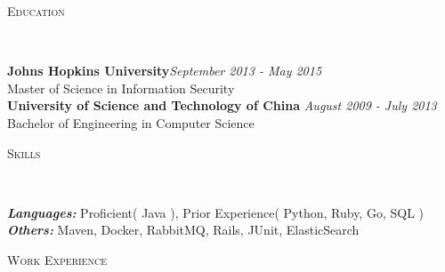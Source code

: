 \documentclass[3pt]{article}
\newenvironment{changemargin}[2]{%
  \begin{list}{}{%
    \setlength{\topsep}{0pt}%
    \setlength{\leftmargin}{#1}%
    \setlength{\rightmargin}{#2}%
    \setlength{\listparindent}{\parindent}%
    \setlength{\itemindent}{\parindent}%
    \setlength{\parsep}{\parskip}%
  }%
  \item[]}{\end{list}
}
\newcommand{\lineover}{
	\begin{changemargin}{-0.05in}{-0.05in}
		\vspace*{-8pt}
		\hrulefill \\
		\vspace*{-2pt}
	\end{changemargin}
}
\newcommand{\header}[1]{
	\begin{changemargin}{-0.5in}{-0.5in}
		{\Large \scshape{#1}}\\
  	\lineover
	\end{changemargin}
}
\newcommand{\contact}[4]{
	\begin{changemargin}{-0.5in}{-0.5in}
		\begin{center}
			{\Large \scshape {#1}}\\ \smallskip
			{#2}\\ \smallskip
			{#3}\\ \smallskip
			{#4}\smallskip
		\end{center}
	\end{changemargin}
}
\newenvironment{body} {
	\vspace*{-16pt}
	\begin{changemargin}{-0.25in}{-0.5in}
  }	
	{\end{changemargin}
}
\begin{document}






\header{Education}

\begin{body}
	\vspace{17pt}
	\textbf{Johns Hopkins University}{}\hfill \emph{September 2013 - May 2015}{} \\
	Master of Science in Information Security \hfill \\
  \smallskip
	\textbf{University of Science and Technology of China} \hfill \emph{August 2009 - July 2013} \\
	Bachelor of Engineering in Computer Science \\
\end{body}

\smallskip

\header{Skills}

\begin{body}
	\vspace{17pt}
	\emph{\textbf{Languages:}}{} Proficient( Java ), Prior Experience( Python, Ruby, Go, SQL )\\
    \emph{\textbf{Others:}}{}  Maven, Docker, RabbitMQ, Rails, JUnit, ElasticSearch\\

\end{body}
\smallskip
\header{Work Experience}
\end{document}
